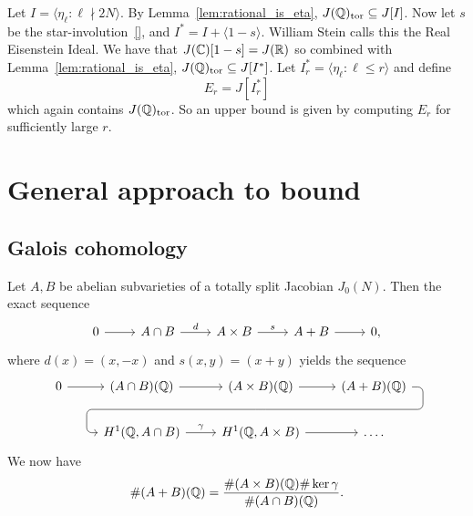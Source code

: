 Let $I= \langle \eta_\ell:\ell\nmid 2N \rangle$. By
Lemma~\ref{lem:rational_is_eta}, $J(\mathbb{Q})_{\mathrm{tor}}\subseteq J[I]$. Now let $s$ be
the star-involution~\ref{}, and $I^*=I + \langle 1-s \rangle$. William Stein
calls this the Real Eisenstein Ideal. We have that $J(\mathbb{C})[1-s]=J(\mathbb{R})$ so
combined with Lemma~\ref{lem:rational_is_eta}, $J(\mathbb{Q})_{\mathrm{tor}}\subseteq
J[I^*]$. Let $I_r ^* = \langle \eta_\ell:\ell\leq r \rangle$ and define
\begin{equation}%
    \label{eq:stein_eta_group}
    E_r = J[I_r ^*]
\end{equation}
which again contains $J(\mathbb{Q})_{\mathrm{tor}}$. So an upper bound is given by computing
$E_r$ for sufficiently large $r$.

\section{General approach to bound}%
\label{sec:galois_cohomology_bounds}

\subsection{Galois cohomology}%
\label{sub:galois_cohomology}

Let $A, B$ be abelian subvarieties of a totally split Jacobian $J_0(N)$. Then
the exact sequence
\begin{equation}%
    \label{eq:ses_ab}
    \begin{tikzcd}
        0 \arrow[r] &
        A\cap B \arrow[r,"d"] &
        A\times B \arrow[r,"s"] &
        A+B \arrow[r] &
        0,
    \end{tikzcd}
\end{equation}
where $d(x)=(x,-x)$ and $s(x,y)=(x+y)$ yields the sequence
\begin{equation}%
    \label{eq:les_ab}
    \begin{tikzcd}
        0 \rar 
        &
        (A\cap B)(\QQ) \rar 
        &
        (A\times B)(\QQ) \rar
        \arrow[phantom, ""{coordinate, name=W}]{d}
        &
        (A+B)(\QQ)
        \arrow[
        rounded corners,
        to path={%
            -- ([xshift=2ex]\tikztostart.east)
            |- (W) [near end]\tikztonodes
            -| ([xshift=-2ex]\tikztotarget.west)
            -- (\tikztotarget)
        }
        ]{dll} \\
        &
        H^1(\QQ,A\cap B) \rar["\gamma"] 
        &
        H^1(\QQ,A\times B) \rar 
        & \ldots.
    \end{tikzcd}
\end{equation}
We now have
\begin{equation}%
    \label{eq:galois_cohomology_order}
    \# (A+B)(\QQ) =
    \frac{\# (A\times B)(\QQ) \# \ker\gamma}{\# (A\cap B)(\QQ)}.
\end{equation}

